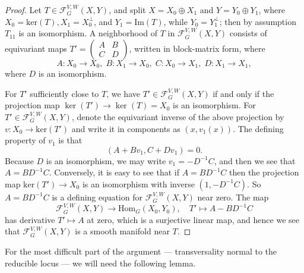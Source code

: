 \documentclass{memo-l}
\theoremstyle{definition}
\theoremstyle{remark}
\numberwithin{section}{chapter}
\numberwithin{equation}{chapter}
\begin{document}
\begin{proof}Let $T \in \mathcal F^{V,W}_G(X, Y)$, and split $X = X_0 \oplus X_1$ and $Y = Y_0 \oplus Y_1$, where $X_0 = \text{ker}(T), X_1 = X_0^\perp$, and $Y_1 = \text{Im}(T)$, while $Y_0 = Y_1^\perp$; then by assumption $T_{11}$ is an isomorphism. A neighborhood of $T$ in $\mathcal F^{V,W}_G(X, Y)$ consists of equivariant maps $T' = \begin{pmatrix}A & B\\ C & D\end{pmatrix}$, written in block-matrix form, where
$$A: X_0 \to X_0, \; B: X_1 \to X_0, \; C: X_0 \to X_1, \; D: X_1 \to X_1,$$
where $D$ is an isomorphism. 

For $T'$ sufficiently close to $T$, we have $T' \in \mathcal F^{V,W}_G(X,Y)$ if and only if the projection map $\ker(T') \to \ker(T) = X_0$ is an isomorphism. For $T' \in \mathcal F^{V,W}_G(X,Y)$, denote the equivariant inverse of the above projection by $v: X_0 \to \text{ker}(T')$ and write it in components as $(x, v_1(x))$. The defining property of $v_1$ is that $$(A + Bv_1, C + Dv_1) = 0.$$ Because $D$ is an isomorphism, we may write $v_1 = - D^{-1} C$, and then we see that $A= BD^{-1} C.$ Conversely, it is easy to see that if $A = BD^{-1} C$ then the projection map $\text{ker}(T') \to X_0$ is an isomorphism with inverse $(1, -D^{-1} C)$. So $A = BD^{-1} C$ is a defining equation for $\mathcal F^{V,W}_G(X, Y)$ near zero. The map 
$$\mathcal F^{V,W}_G(X,Y) \to \text{Hom}_G(X_0, Y_0), \quad T' \mapsto A - BD^{-1} C$$
has derivative $T' \mapsto A$ at zero, which is a surjective linear map, and hence we see that $\mathcal F^{V, W}_G(X, Y)$ is a smooth manifold near $T$.
\end{proof}

For the most difficult part of the argument --- transversality normal to the reducible locus --- we will need the following lemma. 
\end{document}
